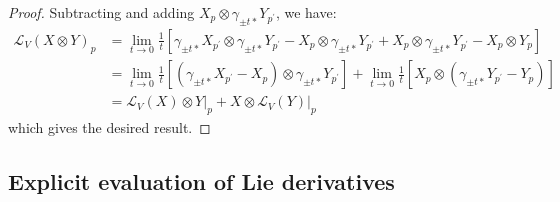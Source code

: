 \begin{enumerate}
{\begin{proof}
            Subtracting and adding $X_p \otimes \gamma_{\pm t*}Y_{p^\prime}$,
            we have:
            \begin{align*}
              \mathcal{L}_V(X \otimes Y)_p &=\lim_{t \to
              0}\frac{1}{t}\left[\gamma_{\pm t*}X_{p^\prime} \otimes
              \gamma_{\pm t*}Y_{p^\prime} - X_p \otimes \gamma_{\pm
              t*}Y_{p^\prime} + X_p \otimes \gamma_{\pm t*}Y_{p^\prime}- X_p
              \otimes Y_p\right] \\
              &= \lim_{t \to 0}\frac{1}{t}\left[\left(\gamma_{\pm
              t*}X_{p^\prime}- X_p \right) \otimes \gamma_{\pm
              t*}Y_{p^\prime} \right] + \lim_{t \to 0}\frac{1}{t}\left[X_p
              \otimes \left(\gamma_{\pm t*}Y_{p^\prime}-Y_p\right)\right] \\
              &= \mathcal{L}_V(X) \otimes Y\Bigr|_p + X \otimes
              \mathcal{L}_V(Y)\Bigr|_p
            \end{align*}
            which gives the desired result.
          \end{proof}}
        \end{enumerate}
    \subsection{Explicit evaluation of Lie derivatives}

